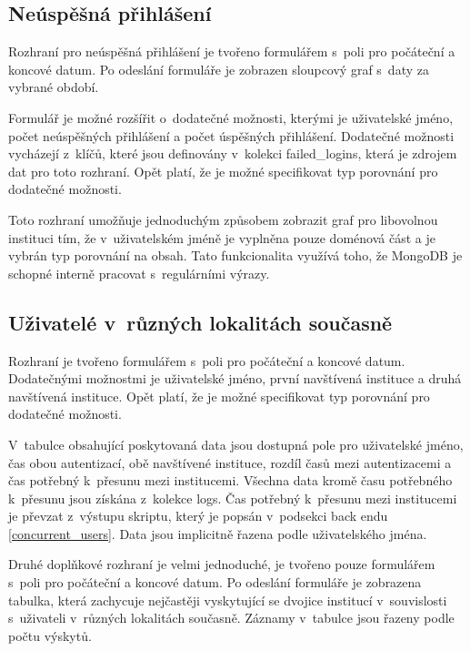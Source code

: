 \documentclass[thesis=M,czech]{FITthesis}[2012/06/26]
\begin{document}
    \subsection{Neúspěšná přihlášení}
      
      Rozhraní pro neúspěšná přihlášení je tvořeno
      formulářem s~poli pro počáteční a koncové datum.
      Po odeslání formuláře je zobrazen sloupcový graf s~daty za vybrané období.
      
      Formulář je možné rozšířit o~dodatečné možnosti, kterými je
      uživatelské jméno, počet neúspěšných přihlášení a počet úspěšných přihlášení.
      Dodatečné možnosti vycházejí z~klíčů, které jsou definovány
      v~kolekci failed\_logins, která je zdrojem dat pro toto rozhraní.
      Opět platí, že je možné specifikovat typ porovnání pro dodatečné možnosti.
      
      Toto rozhraní umožňuje jednoduchým způsobem zobrazit
      graf pro libovolnou instituci tím, že 
      v~uživatelském jméně je vyplněna pouze doménová část a je vybrán typ porovnání na obsah.
      Tato funkcionalita využívá toho, že MongoDB je schopné interně pracovat s~regulárními výrazy.

    \subsection{Uživatelé v~různých lokalitách současně}

      Rozhraní je tvořeno formulářem s~poli pro počáteční a koncové datum.
      Dodatečnými možnostmi je uživatelské jméno,
      první navštívená instituce a druhá navštívená instituce.
      Opět platí, že je možné specifikovat typ porovnání pro dodatečné možnosti.

      V~tabulce obsahující poskytovaná data jsou dostupná pole pro
      uživatelské jméno, čas obou autentizací, obě navštívené instituce,
      rozdíl časů mezi autentizacemi a čas potřebný k~přesunu mezi institucemi.
      Všechna data kromě času potřebného k~přesunu jsou získána z~kolekce logs.
      Čas potřebný k~přesunu mezi institucemi je převzat
      z~výstupu skriptu, který je popsán v~podsekci back endu \ref{concurrent_users}.
      Data jsou implicitně řazena podle uživatelského jména.

      Druhé doplňkové rozhraní je velmi jednoduché, je tvořeno pouze
      formulářem s~poli pro počáteční a koncové datum.
      Po odeslání formuláře je zobrazena tabulka, která zachycuje 
      nejčastěji vyskytující se dvojice institucí v~souvislosti
      s~uživateli v~různých lokalitách současně.
      Záznamy v~tabulce jsou řazeny podle počtu výskytů.
\end{document}
